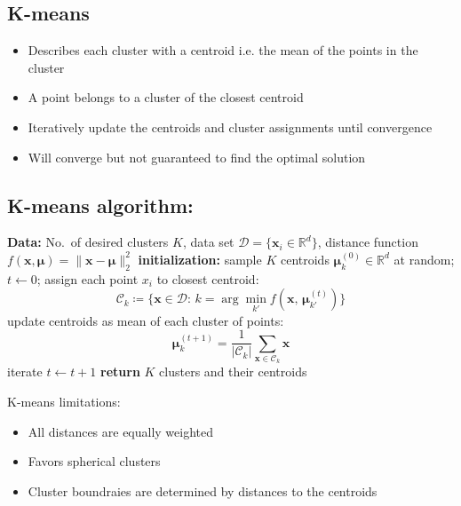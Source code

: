 \documentclass[12pt,a4paper]{article}
\begin{document}
\subsection{K-means}
\begin{itemize}
    \item Describes each cluster with a centroid i.e. the mean of the points in the cluster
    \item A point belongs to a cluster of the closest centroid
    \item Iteratively update the centroids and cluster assignments until convergence
    \item Will converge but not guaranteed to find the optimal solution
\end{itemize}
\newpage
\subsection{K-means algorithm:}

\begin{algorithmic}[1]
    \State \textbf{Data:} No.\ of desired clusters $K$, data set
    $\mathcal{D}=\{\boldsymbol{x}_i\in\mathbb{R}^d\}$,
    \Statex \hspace{3.2em} distance function
    $f(\mathbf{x},\boldsymbol{\mu})=\lVert\mathbf{x}-\boldsymbol{\mu}\rVert_2^2$
    \State \textbf{initialization:} sample $K$ centroids
    $\boldsymbol{\mu}_k^{(0)}\in\mathbb{R}^d$ at random; $t\gets 0$;
    \Repeat
        \State assign each point $x_i$ to closest centroid:
        \[
        \mathcal{C}_k \coloneqq \{\mathbf{x}\in\mathcal{D}:\,
        k = \arg\min_{k'} f\!\left(\mathbf{x},\,\boldsymbol{\mu}_{k'}^{(t)}\right)\}
        \]
        \State update centroids as mean of each cluster of points:
        \[
        \boldsymbol{\mu}_k^{(t+1)} = \frac{1}{|\mathcal{C}_k|}
        \sum_{\mathbf{x}\in\mathcal{C}_k}\mathbf{x}
        \]
        \State iterate $t \gets t+1$
    \State \textbf{return} $K$ clusters and their centroids
\end{algorithmic}

K-means limitations:
\begin{itemize}
    \item All distances are equally weighted
    \item Favors spherical clusters
    \item Cluster boundraies are determined by distances to the centroids
\end{itemize}
\end{document}
